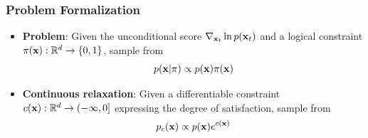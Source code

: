 \begin{frame} %

\frametitle{Problem Formalization}

\begin{itemize}%
    \item \textbf{Problem}: Given the unconditional score $\nabla_{\mathbf{x}_t} \ln p(\mathbf{x}_t)$ and a logical constraint $\pi(\mathbf{x}): \mathbb{R}^d \rightarrow \{0,1\}$, sample from
    \begin{equation*}
        p(\mathbf{x} | \pi) \propto p(\mathbf{x})\pi(\mathbf{x})
    \end{equation*}

    \item \textbf{Continuous relaxation}: Given a differentiable constraint $c(\mathbf{x}): \mathbb{R}^d \rightarrow (-\infty, 0]$ expressing the degree of satisfaction, sample from
    \begin{equation*}
        p_c(\mathbf{x}) \propto p(\mathbf{x})e^{c(\mathbf{x})}
    \end{equation*}
    
\end{itemize}

\end{frame} %









